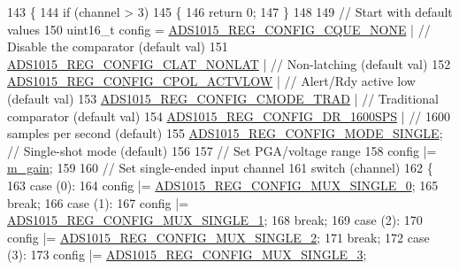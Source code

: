 \begin{DoxyCode}
143                                                               \{
144   \textcolor{keywordflow}{if} (channel > 3)
145   \{
146     \textcolor{keywordflow}{return} 0;
147   \}
148   
149   \textcolor{comment}{// Start with default values}
150   uint16\_t config = \hyperlink{_cool_adafruit___a_d_s1015_8h_aa52ede69f39daf837bb2ebbe639dbef9}{ADS1015\_REG\_CONFIG\_CQUE\_NONE}    | \textcolor{comment}{// Disable the comparator
       (default val)}
151                     \hyperlink{_cool_adafruit___a_d_s1015_8h_a98757804761f1d945f4cf6ca40e30457}{ADS1015\_REG\_CONFIG\_CLAT\_NONLAT}  | \textcolor{comment}{// Non-latching
       (default val)}
152                     \hyperlink{_cool_adafruit___a_d_s1015_8h_a775f732c7e97574b38858820b96cf771}{ADS1015\_REG\_CONFIG\_CPOL\_ACTVLOW} | \textcolor{comment}{// Alert/Rdy active
       low   (default val)}
153                     \hyperlink{_cool_adafruit___a_d_s1015_8h_afb5240325d7ec757ccad7b098a2b93c3}{ADS1015\_REG\_CONFIG\_CMODE\_TRAD}   | \textcolor{comment}{// Traditional
       comparator (default val)}
154                     \hyperlink{_cool_adafruit___a_d_s1015_8h_aa4665026711a8587430d9235dbc4ccf0}{ADS1015\_REG\_CONFIG\_DR\_1600SPS}   | \textcolor{comment}{// 1600 samples per
       second (default)}
155                     \hyperlink{_cool_adafruit___a_d_s1015_8h_a50168c1821f075b7296745be1d4d346f}{ADS1015\_REG\_CONFIG\_MODE\_SINGLE};   \textcolor{comment}{// Single-shot mode
       (default)}
156 
157   \textcolor{comment}{// Set PGA/voltage range}
158   config |= \hyperlink{class_adafruit___a_d_s1015_a8db90fe03d55a18246984ba2ba5e7f32}{m\_gain};
159 
160   \textcolor{comment}{// Set single-ended input channel}
161   \textcolor{keywordflow}{switch} (channel)
162   \{
163     \textcolor{keywordflow}{case} (0):
164       config |= \hyperlink{_cool_adafruit___a_d_s1015_8h_a95d034ea82362b3f6573492209aac4f2}{ADS1015\_REG\_CONFIG\_MUX\_SINGLE\_0};
165       \textcolor{keywordflow}{break};
166     \textcolor{keywordflow}{case} (1):
167       config |= \hyperlink{_cool_adafruit___a_d_s1015_8h_a2db511c8817fda53e31b5d1f72601909}{ADS1015\_REG\_CONFIG\_MUX\_SINGLE\_1};
168       \textcolor{keywordflow}{break};
169     \textcolor{keywordflow}{case} (2):
170       config |= \hyperlink{_cool_adafruit___a_d_s1015_8h_ae31fb46fbe9801ae7bb9210e88b7162d}{ADS1015\_REG\_CONFIG\_MUX\_SINGLE\_2};
171       \textcolor{keywordflow}{break};
172     \textcolor{keywordflow}{case} (3):
173       config |= \hyperlink{_cool_adafruit___a_d_s1015_8h_a9cb6f8bf1d45341e508cece5bcbc7841}{ADS1015\_REG\_CONFIG\_MUX\_SINGLE\_3};

\end{DoxyCode}

